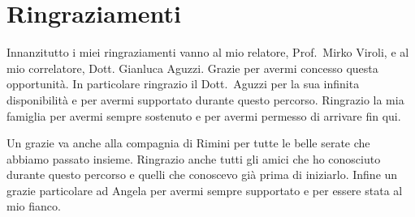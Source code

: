 \documentclass[12pt,a4paper,openright,twoside]{book}
\begin{document}
\mainmatter








\chapter{Ringraziamenti}
Innanzitutto i miei ringraziamenti vanno al mio relatore, Prof.\ Mirko Viroli, e al mio correlatore,
Dott. Gianluca Aguzzi. Grazie per avermi concesso questa opportunità.
In particolare ringrazio il Dott.\ Aguzzi per la sua infinita disponibilità e per avermi supportato durante questo percorso.
Ringrazio la mia famiglia per avermi sempre sostenuto e per avermi permesso di arrivare fin qui.

Un grazie va anche alla compagnia di Rimini per tutte le belle serate che abbiamo passato insieme.
Ringrazio anche tutti gli amici che ho conosciuto durante questo percorso e quelli che conoscevo già prima
di iniziarlo. 
Infine un grazie particolare ad Angela per avermi sempre supportato e per essere stata al mio fianco.

\backmatter\nocite{*} %



\end{document}
